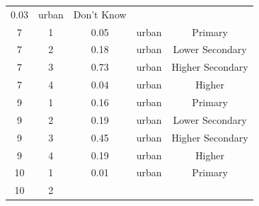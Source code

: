 \documentclass[stu, 12pt, floatsintext,longtable]{apa7}
\begin{document}
\begin{longtable}{ccccc}
    0.03
                                                       &
    urban                                              & Don't Know
    \\
    7                                                  & 1                    &
    0.05
                                                       &
    urban                                              & Primary
    \\
    7                                                  & 2                    &
    0.18
                                                       &
    urban                                              & Lower Secondary
    \\
    7                                                  & 3                    &
    0.73
                                                       &
    urban                                              & Higher Secondary
    \\
    7                                                  & 4                    &
    0.04
                                                       &
    urban                                              & Higher
    \\
    9                                                  & 1                    &
    0.16
                                                       &
    urban                                              & Primary
    \\
    9                                                  & 2                    &
    0.19
                                                       &
    urban                                              & Lower Secondary
    \\
    9                                                  & 3                    &
    0.45
                                                       &
    urban                                              & Higher Secondary
    \\
    9                                                  & 4                    &
    0.19
                                                       &
    urban                                              & Higher
    \\
    10                                                 & 1                    &
    0.01
                                                       &
    urban                                              & Primary
    \\
    10                                                 & 2                    &

\end{longtable}
\end{document}
